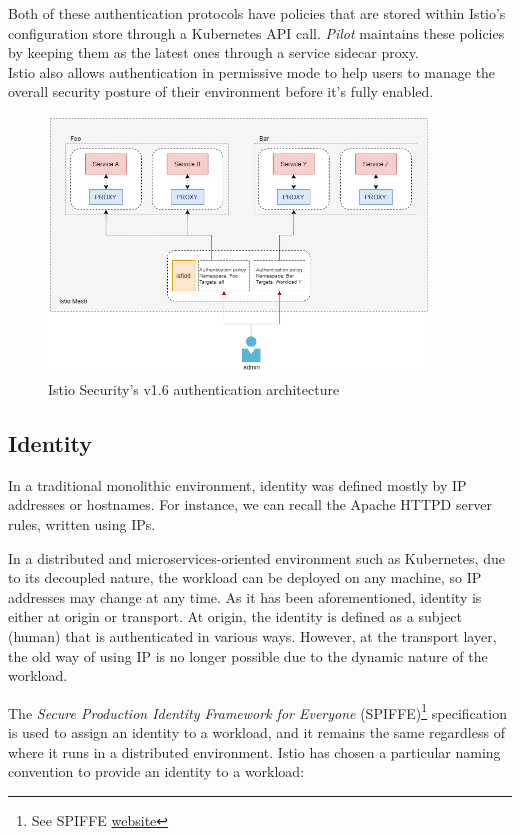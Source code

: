 \noindent Both of these authentication protocols have policies that are stored within Istio's configuration store through a Kubernetes API call. \textit{Pilot} maintains these policies by keeping them as the latest ones through a service sidecar proxy. \\Istio also allows authentication in permissive mode to help users to manage the overall security posture of their environment before it's fully enabled.    

\begin{figure}[ht]
    \centering
    \includegraphics[width=0.9\textwidth]{chapters/images/chp2/arch-auth.png}
    \caption{Istio Security's v1.6 authentication architecture}
    \label{fig:autharc}
\end{figure}

\subsection{Identity}
In a traditional monolithic environment, identity was defined mostly by IP addresses or hostnames. For instance, we can recall the Apache HTTPD server rules, written using IPs.

In a distributed and microservices-oriented environment such as Kubernetes, due to its decoupled nature, the workload can be deployed on any machine, so IP addresses may change at any time. As it has been aforementioned, identity is either at origin or transport. At origin, the identity is defined as a subject (human) that is authenticated in various ways. However, at the transport layer, the old way of using IP is no longer possible due to the dynamic nature of the workload.

The \textit{Secure Production Identity Framework for Everyone} (SPIFFE)\footnote{See SPIFFE \href{https://spiffe.io/}{website}} specification is used to assign an identity to a workload, and it remains the same regardless of where it runs in a distributed environment. Istio has chosen a particular naming convention to provide an identity to a workload:


